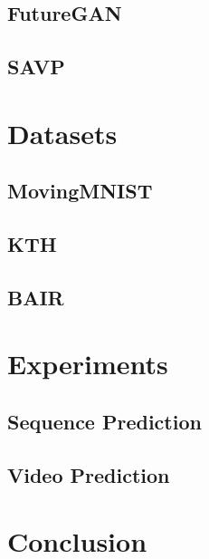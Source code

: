 \documentclass{scrartcl}
\begin{document}
\subsection{FutureGAN}
\label{subsec:futuregan}

\subsection{SAVP}
\label{subsec:savp}

\newpage
\section{Datasets}
\label{sec:datasets}

\subsection{MovingMNIST}
\label{subsec:mmnist}

\subsection{KTH}
\label{subsec:kth}

\subsection{BAIR}
\label{subsec:bair}

\newpage
\section{Experiments}
\label{sec:experiments}

\subsection{Sequence Prediction}
\label{subsec:experiment_sp}

\subsection{Video Prediction}
\label{subsec:experiment_vp}

\newpage
\section{Conclusion}
\label{sec:conclusion}


\newpage

\newpage
\end{document}
